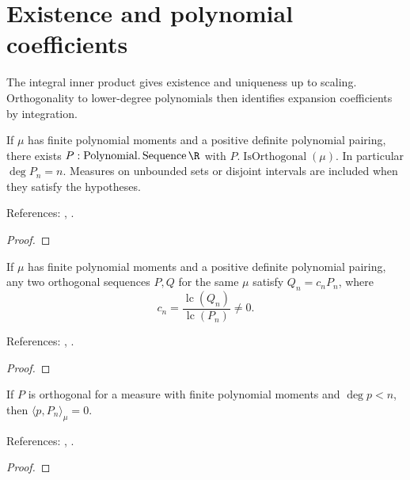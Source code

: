 \section{Existence and polynomial coefficients}\label{sec:textbook-general-existence}

The integral inner product gives existence and uniqueness up to scaling. Orthogonality to lower-degree polynomials then identifies expansion coefficients by integration.

\begin{theorem}
\label{thm:general-existence}
\leanok
If $\mu$ has finite polynomial moments and a positive definite polynomial pairing, there exists
$P:\operatorname{Polynomial.Sequence}\R$ with $P.\operatorname{IsOrthogonal}(\mu)$.
In particular $\deg P_n=n$. Measures on unbounded sets or disjoint intervals are
included when they satisfy the hypotheses.

References: \cite[18.2(i)]{dlmf}, \cite[Chapter 3]{szego}.
\end{theorem}
\begin{proof}
\leanok
\end{proof}

\begin{theorem}
\label{thm:general-uniqueness}
\leanok
If $\mu$ has finite polynomial moments and a positive definite polynomial pairing, any two orthogonal sequences $P,Q$
for the same $\mu$ satisfy $Q_n=c_nP_n$, where
\[c_n=\frac{\operatorname{lc}(Q_n)}{\operatorname{lc}(P_n)}\ne0.\]


References: \cite[18.2(i)]{dlmf}, \cite[Chapter 3]{szego}.
\end{theorem}
\begin{proof}
\leanok
\end{proof}


\begin{theorem}
\label{thm:orthogonal-lower-degree}
\leanok
If $P$ is orthogonal for a measure with finite polynomial moments and
$\deg p<n$, then $\langle p,P_n\rangle_\mu=0$.

References: \cite[18.2(i)]{dlmf}, \cite[Chapter 3]{szego}.
\end{theorem}
\begin{proof}
\leanok
\end{proof}

